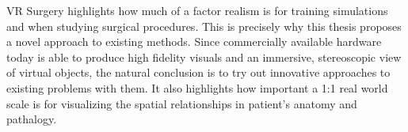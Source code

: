 VR Surgery highlights how much of a factor realism is for training simulations and when studying surgical procedures.
This is precisely why this thesis proposes a novel approach to existing methods.
Since commercially available hardware today is able to produce high fidelity visuals and an immersive, stereoscopic view of virtual objects,
the natural conclusion is to try out innovative approaches to existing problems with them.
It also highlights how important a 1:1 real world scale is for visualizing the spatial relationships in patient's anatomy and pathalogy.



